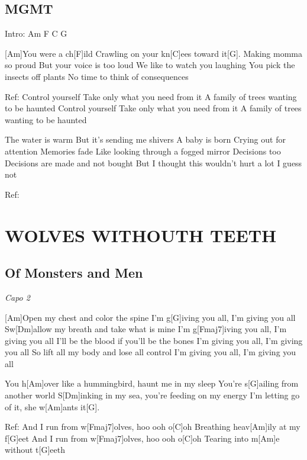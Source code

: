 \documentclass{article}
\begin{document}
\begin{multicols}{2}
\subsection*{MGMT}
\begin{guitar}
	Intro: Am F C G
	
	[Am]You were a ch[F]ild
	Crawling on your kn[C]ees toward it[G]. 
	Making momma so proud
	But your voice is too loud
	We like to watch you laughing
	You pick the insects off plants
	No time to think of consequences
	
	
	Ref:
	Control yourself
	Take only what you need from it
	A family of trees wanting to be haunted
	Control yourself
	Take only what you need from it
	A family of trees wanting to be haunted
	
	
	The water is warm
	But it's sending me shivers
	A baby is born
	Crying out for attention
	Memories fade
	Like looking through a fogged mirror
	Decisions too
	Decisions are made and not bought
	But I thought this wouldn't hurt a lot
	I guess not
	
	Ref:

\end{guitar}

\section*{WOLVES WITHOUTH TEETH}
%
\subsection*{Of Monsters and Men}
\begin{guitar}
	\textit{Capo 2}
	
	 
	[Am]Open my chest and color the spine
	I'm g[G]iving you all, I'm giving you all
	Sw[Dm]allow my breath and take what is mine
	I'm g[Fmaj7]iving you all, I'm giving you all
	I'll be the blood if you'll be the bones
	I'm giving you all, I'm giving you all
	So lift all my body and lose all control
	I'm giving you all, I'm giving you all
	
    You h[Am]over like a hummingbird, haunt me in my sleep
    You're s[G]ailing from another world
    S[Dm]inking in my sea, you're feeding on my energy
    I'm letting go of it, she w[Am]ants it[G].
    
    
    Ref:
    And I run from w[Fmaj7]olves, hoo ooh o[C]oh
    Breathing heav[Am]ily at my f[G]eet
    And I run from w[Fmaj7]olves, hoo ooh o[C]oh
    Tearing into m[Am]e without t[G]eeth
    

\end{guitar}
\end{multicols}
\end{document}
